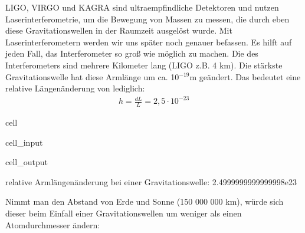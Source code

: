 \documentclass[letterpaper,10pt,english]{jupyterBook}
\begin{document}
\sphinxAtStartPar
LIGO, VIRGO und KAGRA sind ultra\sphinxhyphen{}empfindliche Detektoren und nutzen Laserinterferometrie, um die Bewegung von  Massen zu messen, die durch eben diese Gravitationswellen in der Raumzeit ausgelöst wurde.
Mit Laserinterferometern werden wir uns später noch genauer befassen.
Es hilft auf jeden Fall, das Interferometer so groß wie möglich zu machen. Die  des Interferometers sind mehrere Kilometer lang (LIGO z.B. 4 km). Die stärkste Gravitationswelle hat diese Armlänge um ca. 10\(^{-19}\)m geändert.
Das bedeutet eine relative Längenänderung von lediglich:
\begin{equation*}
\begin{split}h = \frac{dL}{L} = 2,5\cdot 10^{-23}\end{split}
\end{equation*}
\begin{sphinxuseclass}{cell}\begin{sphinxVerbatimInput}

\begin{sphinxuseclass}{cell_input}
\begin{sphinxVerbatim}[commandchars=\\\{\}]
   
   
    
 
\end{sphinxVerbatim}

\end{sphinxuseclass}\end{sphinxVerbatimInput}
\begin{sphinxVerbatimOutput}

\begin{sphinxuseclass}{cell_output}
\begin{sphinxVerbatim}[commandchars=\\\{\}]
relative Armlängenänderung bei einer Gravitationswelle:  2.4999999999999998e\PYGZhy{}23
\end{sphinxVerbatim}

\end{sphinxuseclass}\end{sphinxVerbatimOutput}

\end{sphinxuseclass}
\sphinxAtStartPar
Nimmt man den Abstand von Erde und Sonne (150 000 000 km), würde sich dieser beim Einfall einer Gravitationswellen um weniger als einen Atomdurchmesser ändern:
\end{document}
